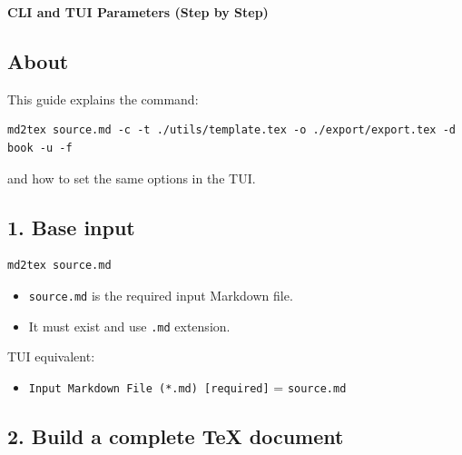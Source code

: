 \documentclass[a4paper, 12pt, twoside]{article}
\begin{document}
\begin{titlepage}
    \vspace*{5cm}
    \begin{center}
        \Huge \textbf{CLI and TUI Parameters (Step by Step)}
    \end{center}
    \vfill
\end{titlepage}

\tableofcontents
\clearpage

\subsection*{About}

This guide explains the command:

\begin{listing}[h!]
    \begin{verbatim}
md2tex source.md -c -t ./utils/template.tex -o ./export/export.tex -d book -u -f
    \end{verbatim}
\end{listing}

and how to set the same options in the TUI.

\subsection*{1. Base input}

\begin{listing}[h!]
    \begin{verbatim}
md2tex source.md
    \end{verbatim}
\end{listing}

\begin{itemize}
    \item \texttt{source.md} is the required input Markdown file.
    \item It must exist and use \texttt{.md} extension.
\end{itemize}

TUI equivalent:

\begin{itemize}
    \item \texttt{Input Markdown File (*.md) [required]} = \texttt{source.md}
\end{itemize}

\subsection*{2. Build a complete TeX document}
\end{document}

